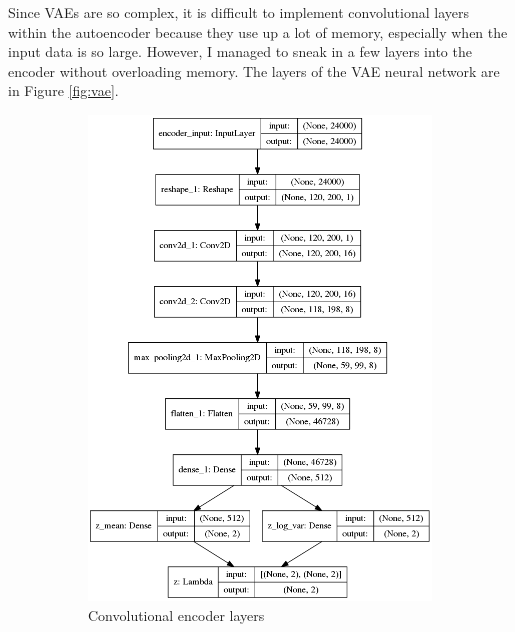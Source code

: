 \documentclass[a4paper]{article}
\begin{document}
Since VAEs are so complex, it is difficult to implement convolutional layers within the autoencoder because they use up a lot of memory, especially when the input data is so large. However, I managed to sneak in a few layers into the encoder without overloading memory. The layers of the VAE neural network are in Figure \ref{fig:vae}.

\begin{figure}[h!]
	\centering
	\begin{subfigure}{.49\textwidth}
		\centering
		\includegraphics[width=1\linewidth]{vae_mlp_encoder}
		\caption{Convolutional encoder layers}
		\label{fig:encoder}
	\end{subfigure}
	\begin{subfigure}{.49\textwidth}
		\centering
		\begin{subfigure}{.6\textwidth}
			\centering

\end{subfigure}
\end{subfigure}
\end{figure}
\end{document}
